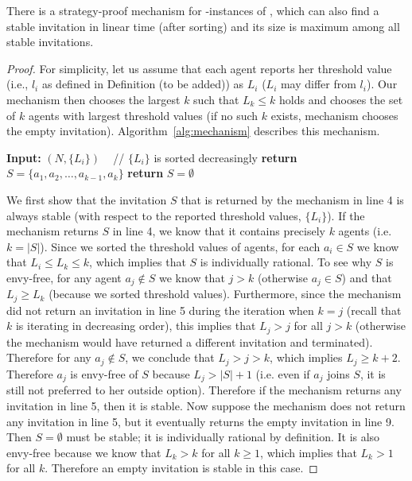 \begin{theorem} \label{GT:thm:mechanism}
	There is a strategy-proof mechanism for \INC-instances of \ASIP, which can also find a stable invitation in linear time (after sorting) and its size is maximum among all stable invitations.
\end{theorem}
\begin{proof}
For simplicity, let us assume that each agent reports her threshold value (i.e., $l_i$ as defined in Definition (to be added)) as $L_i$ ($L_i$ may differ from $l_i$). Our mechanism then chooses the largest $k$ such that $L_k \leq k$ holds and chooses the set of $k$ agents with largest threshold values (if no such $k$ exists, mechanism chooses the empty invitation). Algorithm~\ref{alg:mechanism} describes this mechanism.
\begin{algorithm}
	\caption{Strategy-proof Mechanism}
	\label{alg:mechanism}
\begin{algorithmic}[1]
	\State \textbf{Input:} $(N, \{L_i\})$ ~ // $\{L_i\}$ is sorted decreasingly
			\State \textbf{return} $S = \{a_1, a_2, \dots, a_{k-1}, a_{k}\}$
		\EndIf
	\EndFor
	\State \textbf{return} $S = \emptyset$
\end{algorithmic}
\end{algorithm} 
	
We first show that the invitation $S$ that is returned by the mechanism in line 4 is always stable (with respect to the reported threshold values, $\{L_i\}$). If the mechanism returns $S$ in line 4, we know that it contains precisely $k$ agents (i.e. $k = |S|$). Since we sorted the threshold values of agents, for each $a_i \in S$ we know that $L_i \leq L_k \leq k$, which implies that $S$ is individually rational. To see why $S$ is envy-free, for any agent $a_j\not\in S$ we know that $j > k$ (otherwise $a_j\in S$) and that $L_j \geq L_k$ (because we sorted threshold values). Furthermore, since the mechanism did not return an invitation in line 5 during the iteration when $k = j$ (recall that $k$ is iterating in decreasing order), this implies that $L_j > j$ for all $j > k$ (otherwise the mechanism would have returned a different invitation and terminated). Therefore for any $a_j\not\in S$, we conclude that $L_j > j > k$, which implies $L_j \geq k+2$. Therefore $a_j$ is envy-free of $S$ because $L_j > |S| + 1$ (i.e. even if $a_j$ joins $S$, it is still not preferred to her outside option). Therefore if the mechanism returns any invitation in line 5, then it is stable. Now suppose the mechanism does not return any invitation in line 5, but it eventually returns the empty invitation in line 9. Then $S = \emptyset$ must be stable; it is individually rational by definition. It is also envy-free because we know that $L_k > k$ for all $k \geq 1$, which implies that $L_k > 1$ for all $k$. Therefore an empty invitation is stable in this case.


\end{proof}
